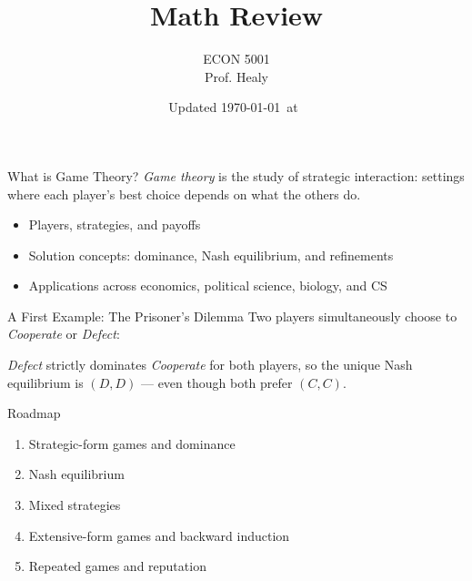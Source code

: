 


\title[Math Review]{Math Review}
\author[ECON 5001]{ECON 5001\\Prof. Healy} \color{metrop}
\institute[OSU]{}
\date[]{\vfill {\tiny Updated \today\ at\ \DTMcurrenttime}}



\frame{\maketitle}

\begin{frame}{What is Game Theory?}
\textit{Game theory} is the study of strategic interaction: settings where
each player's best choice depends on what the others do.
\bsk
\begin{itemize}
    \item Players, strategies, and payoffs
    \item Solution concepts: dominance, Nash equilibrium, and refinements
    \item Applications across economics, political science, biology, and CS
\end{itemize}
\end{frame}

\begin{frame}{A First Example: The Prisoner's Dilemma}
Two players simultaneously choose to \emph{Cooperate} or \emph{Defect}:
\bsk
\begin{center}
\begin{matrixgame}[top left={C, D}, player names={Player 1, Player 2}, br]
\end{matrixgame}
\end{center}
\bsk
\emph{Defect} strictly dominates \emph{Cooperate} for both players, so the
unique Nash equilibrium is $(D,D)$ --- even though both prefer $(C,C)$.
\end{frame}

\begin{frame}{Roadmap}
\begin{enumerate}
    \item Strategic-form games and dominance
    \item Nash equilibrium
    \item Mixed strategies
    \item Extensive-form games and backward induction
    \item Repeated games and reputation
\end{enumerate}
\end{frame}


